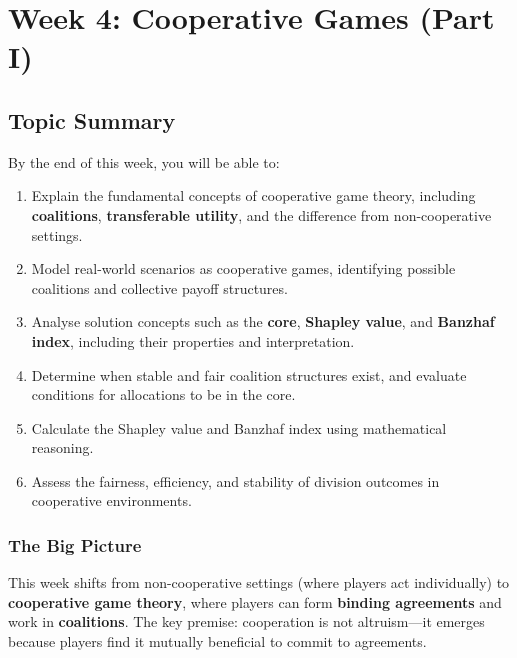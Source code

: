 \section{Week 4: Cooperative Games (Part I)}

\subsection{Topic Summary}

\begin{keybox}
By the end of this week, you will be able to:
\begin{enumerate}
  \item Explain the fundamental concepts of cooperative game theory, including \textbf{coalitions}, \textbf{transferable utility}, and the difference from non-cooperative settings.
  \item Model real-world scenarios as cooperative games, identifying possible coalitions and collective payoff structures.
  \item Analyse solution concepts such as the \textbf{core}, \textbf{Shapley value}, and \textbf{Banzhaf index}, including their properties and interpretation.
  \item Determine when stable and fair coalition structures exist, and evaluate conditions for allocations to be in the core.
  \item Calculate the Shapley value and Banzhaf index using mathematical reasoning.
  \item Assess the fairness, efficiency, and stability of division outcomes in cooperative environments.
\end{enumerate}
\end{keybox}

\separator

\subsubsection*{The Big Picture}

This week shifts from non-cooperative settings (where players act individually) to \textbf{cooperative game theory}, where players can form \textbf{binding agreements} and work in \textbf{coalitions}. The key premise: cooperation is not altruism---it emerges because players find it mutually beneficial to commit to agreements.

